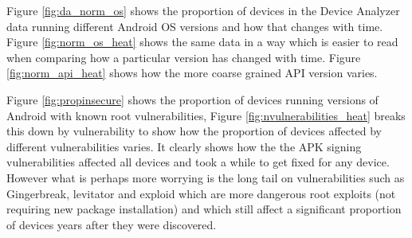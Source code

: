 \documentclass[a4paper,twocolumn]{article}
\begin{document}
Figure \ref{fig:da_norm_os} shows the proportion of devices in the Device Analyzer data running different Android OS versions and how that changes with time.
Figure \ref{fig:norm_os_heat} shows the same data in a way which is easier to read when comparing how a particular version has changed with time.
Figure \ref{fig:norm_api_heat} shows how the more coarse grained API version varies.

Figure \ref{fig:propinsecure} shows the proportion of devices running versions of Android with known root vulnerabilities, Figure \ref{fig:nvulnerabilities_heat} breaks this down by vulnerability to show how the proportion of devices affected by different vulnerabilities varies.
It clearly shows how the the APK signing vulnerabilities affected all devices and took a while to get fixed for any device.
However what is perhaps more worrying is the long tail on vulnerabilities such as Gingerbreak, levitator and exploid which are more dangerous root exploits (not requiring new package installation) and which still affect a significant proportion of devices years after they were discovered.
\end{document}
